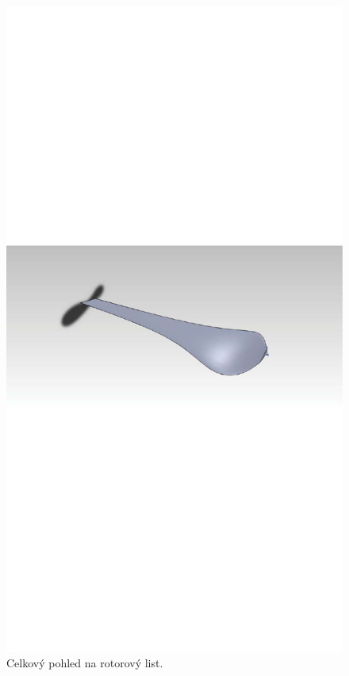 	\begin{figure}[H]
				\centering
				\includegraphics[]{obrazky/rotor/listp}
				\caption{Celkový pohled na rotorový list.}
				\label{obr.model1}
	\end{figure}
	
